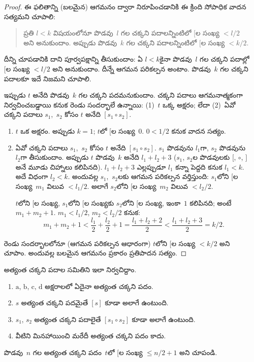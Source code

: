 \documentclass[../../../include/open-logic-section]{subfiles}
\begin{document}
\begin{proof}
ఈ ఫలితాన్ని (బలమైన) ఆగమనం ద్వారా నిరూపించడానికి ఈ క్రింది సోపాధిక వాదన సత్యమని చూపాలి:
\begin{quote}
  ప్రతి $l < k$ విషయంలోనూ పొడవు~$l$ గల చక్కని పదాలన్నింటిలో
  $[$ల సంఖ్య $< l/2$ అని అనుకుందాం. అప్పుడు పొడవు~$k$ గల
  చక్కని పదాలన్నింటిలో $[$ల సంఖ్య $< k/2$.
\end{quote}
దీన్ని చూపడానికి దాని పూర్వపక్షాన్ని తీసుకుందాం: ఏ $l<k$కైనా పొడవు~$l$ గల చక్కని పదాల్లో $[$ల సంఖ్య $< l/2$ అని అనుకుందాం. దీన్నే ఆగమన పరికల్పన అంటాం. పొడవు~$k$ గల చక్కని పదాలకూ ఇదే నిజమని చూపాలి.

ఇప్పుడు $t$ అనేది పొడవు~$k$ గల చక్కని పదమనుకుందాం. చక్కని పదాలు ఆగమనాత్మకంగా నిర్వచించబడ్డాయి కనుక రెండు సందర్భాలే ఉన్నాయి: (1)~$t$ ఒక్క అక్షరం; లేదా (2)~ఏవో చక్కని పదాలు $s_1$,~$s_2$ కోసం $t$ అనేది $[s_1 \circ s_2]$.
\begin{enumerate}
\item $t$ ఒక అక్షరం. అప్పుడు $k = 1$; $t$లో $[$ల సంఖ్య~$0$. $0 < 1/2$ కనుక వాదన సత్యం.
\item ఏవో చక్కని పదాలు $s_1$,~$s_2$ కోసం $t$ అనేది $[s_1 \circ s_2]$. $s_1$ పొడవును $l_1$గా, $s_2$ పొడవును $l_2$గా తీసుకుందాం. అప్పుడు $t$ పొడవు~$k$ అనేది $l_1+l_2+3$ ($s_1$, $s_2$ల పొడవులకు $[$, $\circ$, $]$ అనే మూడు చిహ్నాలు కలిపినది). $l_1+l_2+3$ ఎల్లప్పుడూ $l_1$ కన్నా పెద్దది కనుక $l_1 < k$. అదే విధంగా $l_2
  < k$. అందువల్ల $s_1$,~$s_2$లకు ఆగమన పరికల్పన వర్తిస్తుంది: $s_1$లోని $[$ల సంఖ్య~$m_1$ విలువ $< l_1/2$. అలాగే $s_2$లోని $[$ల సంఖ్య~$m_2$ విలువ $< l_2/2$.

  $t$లోని $[$ల సంఖ్య, $s_1$లోని $[$ల సంఖ్యకు $s_2$లోని $[$ల సంఖ్య, ఇంకా~$1$ కలిపినది; అంటే $m_1 + m_2 + 1$. $m_1 < l_1/2$, $m_2 < l_2/2$ కనుక:
  \[
  m_1 + m_2 + 1 < \frac{l_1}{2} + \frac{l_2}{2} + 1 = \frac{l_1+l_2+2}{2} < \frac{l_1+l_2+3}{2} = k/2.
  \]
\end{enumerate}
రెండు సందర్భాలలోనూ (ఆగమన పరికల్పన ఆధారంగా) $t$లోని $[$ల సంఖ్య $< k/2$ అని చూపాం. అందువల్ల బలమైన ఆగమనం ప్రకారం ప్రతిపాదన సత్యం.
\end{proof}

\begin{prob}
  అత్యంత చక్కని పదాల సమితిని ఇలా నిర్వచిద్దాం.
  \begin{enumerate}
  \item $\mathrm{a}$, $\mathrm{b}$, $\mathrm{c}$,
    $\mathrm{d}$ అక్షరాలలో ఏదైనా అత్యంత చక్కని పదం.
  \item $s$ అత్యంత చక్కని పదమైతే $[s]$ కూడా అలాగే ఉంటుంది.
  \item $s_1$, $s_2$ అత్యంత చక్కని పదాలైతే
    $[s_1 \circ s_2]$ కూడా అలాగే ఉంటుంది.
  \item వీటిని మినహాయించి మరేదీ అత్యంత చక్కని పదం కాదు.
  \end{enumerate}
  పొడవు~$n$ గల అత్యంత చక్కని పదం~$t$లో $[$ల సంఖ్య
    $\le n/2 +1$ అని చూపండి.
\end{prob}
\end{document}
